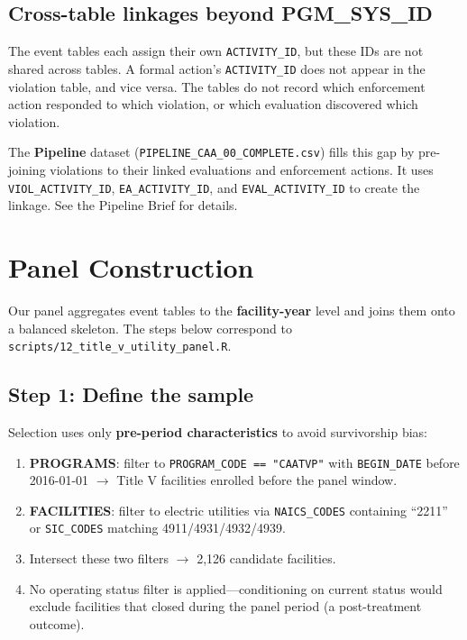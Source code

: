 \documentclass[11pt]{article}
\begin{document}
\subsection*{Cross-table linkages beyond PGM\_SYS\_ID}

The event tables each assign their own \texttt{ACTIVITY\_ID}, but these IDs are not shared across tables. A formal action's \texttt{ACTIVITY\_ID} does not appear in the violation table, and vice versa. The tables do not record which enforcement action responded to which violation, or which evaluation discovered which violation.

The \textbf{Pipeline} dataset (\texttt{PIPELINE\_CAA\_00\_COMPLETE.csv}) fills this gap by pre-joining violations to their linked evaluations and enforcement actions. It uses \texttt{VIOL\_ACTIVITY\_ID}, \texttt{EA\_ACTIVITY\_ID}, and \texttt{EVAL\_ACTIVITY\_ID} to create the linkage. See the Pipeline Brief for details.

\section{Panel Construction}

Our panel aggregates event tables to the \textbf{facility-year} level and joins them onto a balanced skeleton. The steps below correspond to \texttt{scripts/12\_title\_v\_utility\_panel.R}.

\subsection{Step 1: Define the sample}

Selection uses only \textbf{pre-period characteristics} to avoid survivorship bias:

\begin{enumerate}[nosep]
  \item \textbf{PROGRAMS}: filter to \texttt{PROGRAM\_CODE == "CAATVP"} with \texttt{BEGIN\_DATE} before 2016-01-01 $\rightarrow$ Title V facilities enrolled before the panel window.
  \item \textbf{FACILITIES}: filter to electric utilities via \texttt{NAICS\_CODES} containing ``2211'' or \texttt{SIC\_CODES} matching 4911/4931/4932/4939.
  \item Intersect these two filters $\rightarrow$ 2,126 candidate facilities.
  \item No operating status filter is applied---conditioning on current status would exclude facilities that closed during the panel period (a post-treatment outcome).
\end{enumerate}
\end{document}
